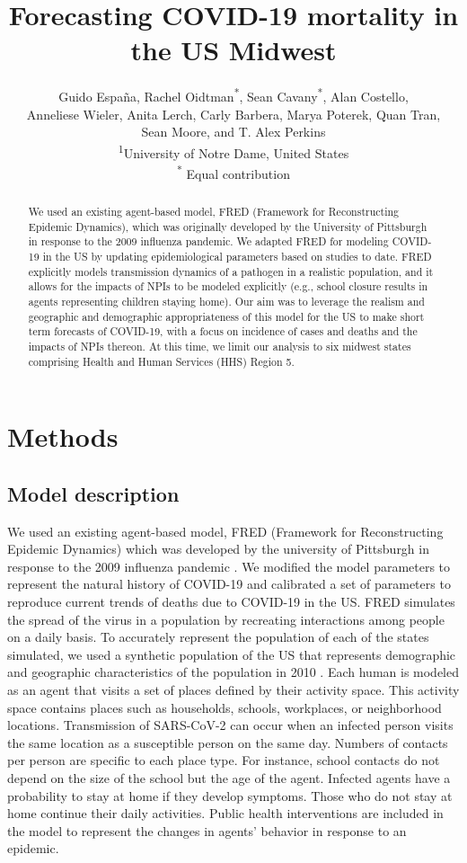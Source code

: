 \documentclass[11pt]{article}
\date{}
\title{Forecasting COVID-19 mortality in the US Midwest}
\author{Guido Espa\~na,  Rachel Oidtman\textsuperscript{*}, Sean Cavany\textsuperscript{*}, Alan Costello, \\Anneliese Wieler, Anita Lerch, Carly Barbera,  Marya Poterek, Quan Tran,\\ Sean Moore, and T. Alex Perkins\\
  \textsuperscript{1}University of Notre Dame, United States\\  
  \textsuperscript{*} Equal contribution
}
\begin{document}
  
\linenumbers
\maketitle

\setcounter{page}{1}
\begin{abstract}
We used an existing agent-based model, FRED (Framework for Reconstructing Epidemic Dynamics), which was originally developed by the University of Pittsburgh in response to the 2009 influenza pandemic. We adapted FRED for modeling COVID-19 in the US by updating epidemiological parameters based on studies to date. FRED explicitly models transmission dynamics of a pathogen in a realistic population, and it allows for the impacts of NPIs to be modeled explicitly (e.g., school closure results in agents representing children staying home). Our aim was to leverage the realism and geographic and demographic appropriateness of this model for the US to make short term forecasts of COVID-19, with a focus on incidence of cases and deaths and the impacts of NPIs thereon. At this time, we limit our analysis to six midwest states comprising Health and Human Services (HHS) Region 5.
\end{abstract}

\section{Methods}
\subsection{Model description}

We used an existing agent-based model, FRED (Framework for Reconstructing Epidemic Dynamics) which was developed by the university of Pittsburgh in response to the 2009 influenza pandemic \cite{grefenstette2013}. We modified the model parameters to represent the natural history of COVID-19 and calibrated a set of parameters to reproduce current trends of deaths due to COVID-19 in the US. FRED simulates the spread of the virus in a population by recreating interactions among people on a daily basis. To accurately represent the population of each of the states simulated, we used a synthetic population of the US that represents demographic and geographic characteristics of the population in 2010 \cite{Wheaton2012}. Each human is modeled as an agent that visits a set of places defined by their activity space. This activity space contains places such as households, schools, workplaces, or neighborhood locations. Transmission of SARS-CoV-2 can occur when an infected person visits the same location as a susceptible person on the same day. Numbers of contacts per person are specific to each place type. For instance, school contacts do not depend on the size of the school but the age of the agent. Infected agents have a probability to stay at home if they develop symptoms. Those who do not stay at home continue their daily activities. Public health interventions are included in the model to represent the changes in agents’ behavior in response to an epidemic. 
\end{document}

